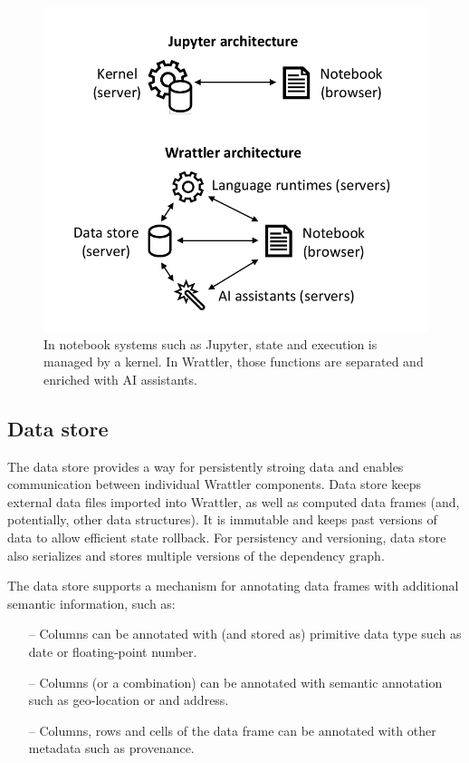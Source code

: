 \documentclass[sigplan,preprint,10pt]{acmart}\settopmatter{printfolios=true,printccs=false,printacmref=false}
\theoremstyle{plain}
\theoremstyle{definition}
\begin{document}
\begin{figure}
\includegraphics[scale=0.6]{diagram.pdf}
\caption{\small{In notebook systems such as Jupyter, state and execution is managed by a kernel. In
  Wrattler, those functions are separated and enriched with AI assistants.}}
\label{fig:arch}
\end{figure}


\subsection{Data store}
\label{sec:wrattler-ds}

The data store provides a way for persistently stroing data and enables communication between
individual Wrattler components. Data store keeps external data files imported into Wrattler,
as well as computed data frames (and, potentially, other data structures). It is immutable
and keeps past versions of data to allow efficient state rollback. For persistency and versioning,
data store also serializes and stores multiple versions of the dependency graph.

The data store supports a mechanism for annotating data frames with additional semantic information, such as:
%
\begin{itemize}
\item[--] Columns can be annotated with (and stored as) primitive data type such as date or floating-point number.
\vspace{0.25em}
\item[--] Columns (or a combination) can be annotated with semantic annotation such as geo-location or and address.
\vspace{-0.85em}
\item[--] Columns, rows and cells of the data frame can be annotated with other metadata such as provenance.
\end{itemize}
\end{document}
